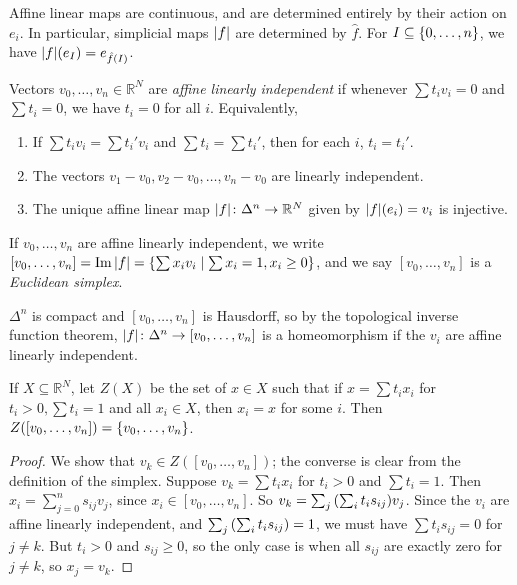 \begin{remark}
	Affine linear maps are continuous, and are determined entirely by their action on \( e_i \).
	In particular, simplicial maps \( \abs{f} \) are determined by \( \hat f \).
	For \( I \subseteq \qty{0, \dots, n} \), we have \( \abs{f}(e_I) = e_{\hat f(I)} \).
\end{remark}
\begin{definition}
	Vectors \( v_0, \dots, v_n \in \mathbb R^N \) are \emph{affine linearly independent} if whenever \( \sum t_i v_i = 0 \) and \( \sum t_i = 0 \), we have \( t_i = 0 \) for all \( i \).
	Equivalently,
	\begin{enumerate}
		\item If \( \sum t_i v_i = \sum t_i' v_i \) and \( \sum t_i = \sum t_i' \), then for each \( i \), \( t_i = t_i' \).
		\item The vectors \( v_1 - v_0, v_2 - v_0, \dots, v_n - v_0 \) are linearly independent.
		\item The unique affine linear map \( \abs{f} \colon \Delta^n \to \mathbb R^N \) given by \( \abs{f}(e_i) = v_i \) is injective.
	\end{enumerate}
	If \( v_0, \dots, v_n \) are affine linearly independent, we write \( [v_0, \dots, v_n] = \Im \abs{f} = \qty{\sum x_i v_i \mid \sum x_i = 1, x_i \geq 0} \), and we say \( [v_0, \dots, v_n] \) is a \emph{Euclidean simplex}.
\end{definition}
\begin{remark}
	\( \Delta^n \) is compact and \( [v_0, \dots, v_n] \) is Hausdorff, so by the topological inverse function theorem, \( \abs{f} \colon \Delta^n \to [v_0, \dots, v_n] \) is a homeomorphism if the \( v_i \) are affine linearly independent.
\end{remark}
\begin{lemma}
	If \( X \subseteq \mathbb R^N \), let \( Z(X) \) be the set of \( x \in X \) such that if \( x = \sum t_i x_i \) for \( t_i > 0, \sum t_i = 1 \) and all \( x_i \in X \), then \( x_i = x \) for some \( i \).
	Then \( Z([v_0, \dots, v_n]) = \qty{v_0, \dots, v_n} \).
\end{lemma}
\begin{proof}
	We show that \( v_k \in Z([v_0, \dots, v_n]) \); the converse is clear from the definition of the simplex.
	Suppose \( v_k = \sum t_i x_i \) for \( t_i > 0 \) and \( \sum t_i = 1 \).
	Then \( x_i = \sum_{j=0}^n s_{ij} v_j \), since \( x_i \in [v_0, \dots, v_n] \).
	So \( v_k = \sum_j \qty(\sum_i t_i s_{ij}) v_j \).
	Since the \( v_i \) are affine linearly independent, and \( \sum_j \qty(\sum_i t_i s_{ij}) = 1 \), we must have \( \sum t_i s_{ij} = 0 \) for \( j \neq k \).
	But \( t_i > 0 \) and \( s_{ij} \geq 0 \), so the only case is when all \( s_{ij} \) are exactly zero for \( j \neq k \), so \( x_j = v_k \).
\end{proof}
